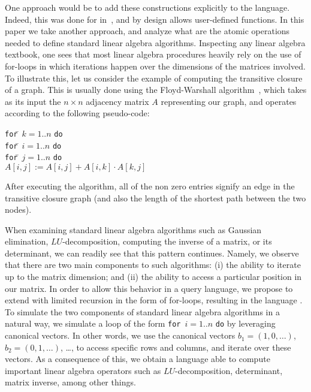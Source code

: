 One approach would be to add these constructions explicitly to the language. Indeed, this was done for \lang in~\cite{matlang-journal}, and \lara by design allows user-defined functions. In this paper we take another approach, and analyze what are the atomic operations needed to define standard linear algebra algorithms. Inspecting any linear algebra textbook, one sees that most linear algebra procedures heavily rely on the use of for-loops in which iterations happen over the dimensions of the matrices involved. To illustrate this, let us consider the example of computing the transitive closure of a graph. This is usually done using  the Floyd-Warshall algorithm~\cite{cormen}, which takes as its input the $n\times n$ adjacency matrix $A$ representing our graph, and operates according to the following pseudo-code:
\vspace{-1ex}
\begin{tabbing}
\quad\texttt{for}\=\,  $k = 1..n$ \texttt{do}\\
\> \texttt{for}\=\,  $i = 1..n$ \texttt{do}\\
\> \> \texttt{for}\=\,  $j = 1..n$ \texttt{do}\\
\> \> \> $A[i,j] := A[i,j] + A[i,k]\cdot A[k,j]$
\end{tabbing}
After executing the algorithm, all of the non zero entries signify an edge in the transitive closure graph (and also the length of the shortest path between the two nodes). 

When examining standard linear algebra algorithms such as Gaussian elimination, $LU$-decomposition, computing the inverse of a matrix, or its determinant, we can readily see that this pattern continues. Namely, we observe that there are two main components to such algorithms: (i) the ability to iterate up to the matrix dimension; and (ii) the ability to access a particular position in our matrix. In order to allow this behavior in a query language, we propose to extend \lang with limited recursion in the form of for-loops, resulting in the language \langfor. To  simulate the two components of standard linear algebra algorithms in a natural way, we simulate a loop of the form \texttt{for}\, $i=1..n$ \texttt{do} by leveraging canonical vectors. In other words, we use the canonical vectors $b_1=(1,0,\ldots)$, $b_2=(0,1,\ldots)$, \ldots, to access specific rows and columns, and iterate over these vectors. As a consequence of this, we obtain a language able to compute important linear algebra operators such as $LU$-decomposition, determinant, matrix inverse, among other things.

